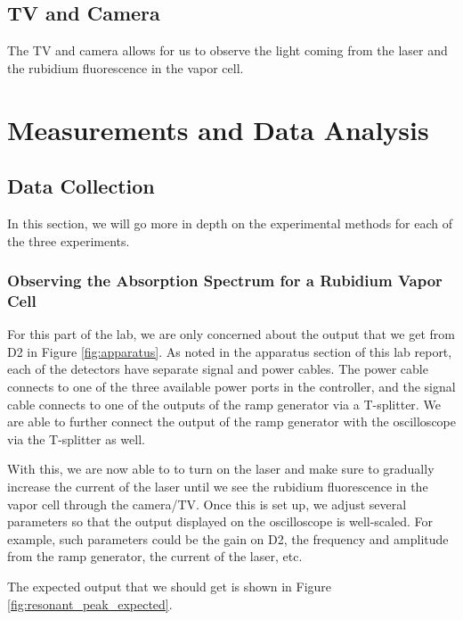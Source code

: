\documentclass[twocolumn,amsmath,amssymb,pra, floatfix]{revtex4-2}
\begin{document}
\subsection{TV and Camera}
The TV and camera allows for us to observe the light coming from the laser and the rubidium fluorescence in the vapor cell. 

\section{Measurements and Data Analysis}

\subsection{Data Collection}
\label{sec:data collection}
In this section, we will go more in depth on the experimental methods for each of the three experiments. 

\subsubsection{Observing the Absorption Spectrum for a Rubidium Vapor Cell}
For this part of the lab, we are only concerned about the output that we get from D2 in Figure \ref{fig:apparatus}. As noted in the apparatus section of this lab report, each of the detectors have separate signal and power cables. The power cable connects to one of the three available power ports in the controller, and the signal cable connects to one of the outputs of the ramp generator via a T-splitter. We are able to further connect the output of the ramp generator with the oscilloscope via the T-splitter as well.

With this, we are now able to to turn on the laser and make sure to gradually increase the current of the laser until we see the rubidium fluorescence in the vapor cell through the camera/TV. Once this is set up, we adjust several parameters so that the output displayed on the oscilloscope is well-scaled. For example, such parameters could be the gain on D2, the frequency and amplitude from the ramp generator, the current of the laser, etc.

The expected output that we should get is shown in Figure \ref{fig:resonant_peak_expected}. 
\end{document}
